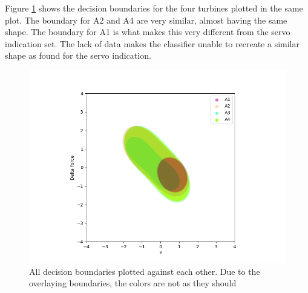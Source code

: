             
            Figure \ref{fig:all_classes_startup_oneclass} shows the decision boundaries for the four turbines plotted in the same plot. The boundary for A2 and A4 are very similar, almost having the same shape. The boundary for A1 is what makes this very different from the servo indication set. The lack of data makes the classifier unable to recreate a similar shape as found for the servo indication.
            
            
            \begin{figure}[]
                \centering
                \includegraphics[scale=0.6]{figures/analysis/oneclass_servo/All_classes_One_SVM_startup.png}
                \caption{All decision boundaries plotted against each other. Due to the overlaying boundaries, the colors are not as they should}
                \label{fig:all_classes_startup_oneclass}
            \end{figure}
            

